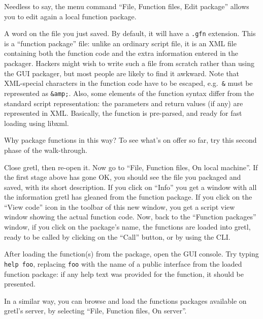Needless to say, the menu command ``File, Function files, Edit package''
allows you to edit again a local function package.

\vspace{6pt}

A word on the file you just saved.  By default, it will have a
\texttt{.gfn} extension.  This is a ``function package'' file: unlike
an ordinary  script file, it is an XML file containing both
the function code and the extra information entered in the packager.
Hackers might wish to write such a file from scratch rather than using
the GUI packager, but most people are likely to find it awkward.  Note
that XML-special characters in the function code have to be escaped,
e.g.\ \texttt{\&} must be represented as \texttt{\&amp;}.  Also, some
elements of the function syntax differ from the standard script
representation: the parameters and return values (if any) are
represented in XML.  Basically, the function is pre-parsed, and ready
for fast loading using \textsf{libxml}.

\vspace{6pt}

Why package functions in this way?  To see what's on offer so far, try
this second phase of the walk-through.

Close gretl, then re-open it.  Now go to ``File, Function files, On
local machine''. If the first stage above has gone OK, you should
see the file you packaged and saved, with its short description.  If
you click on ``Info'' you get a window with all the information gretl
has gleaned from the function package.  If you click on the ``View
code'' icon in the toolbar of this new window, you get a script view
window showing the actual function code. Now, back to the ``Function
packages'' window, if you click on the package's name, the functions
are loaded into gretl, ready to be called by clicking on the ``Call''
button, or by using the CLI.

After loading the function(s) from the package, open the GUI console.
Try typing \texttt{help foo}, replacing \texttt{foo} with the name of
a public interface from the loaded function package: if any help text
was provided for the function, it should be presented.

In a similar way, you can browse and load the functions packages
available on gretl's server, by selecting ``File, Function files, On
server''.


